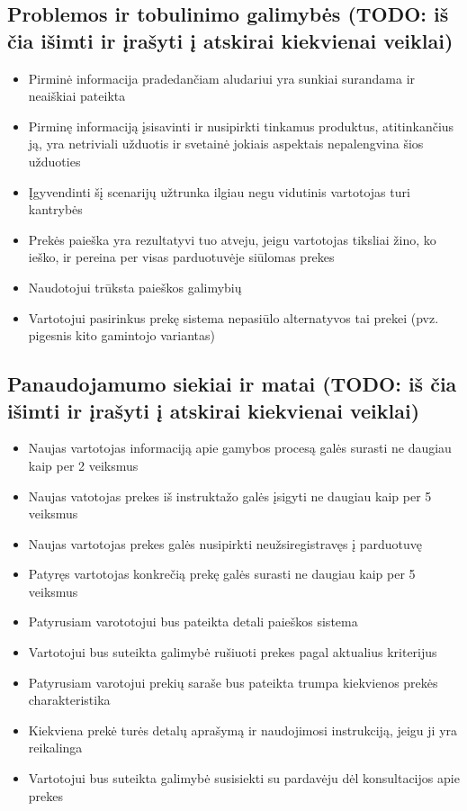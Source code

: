 \documentclass[oneside]{VUMIFPSkursinis}
\begin{document}
	\subsection{Problemos ir tobulinimo galimybės (TODO: iš čia išimti ir įrašyti į atskirai kiekvienai veiklai)}
		\begin{itemize}
			\item{Pirminė informacija pradedančiam aludariui yra sunkiai surandama ir neaiškiai pateikta}
			\item{Pirminę informaciją įsisavinti ir nusipirkti tinkamus produktus, atitinkančius ją, yra netriviali užduotis ir svetainė jokiais aspektais nepalengvina šios užduoties}
			\item{Įgyvendinti šį scenarijų užtrunka ilgiau negu vidutinis vartotojas turi kantrybės}
			\item{Prekės paieška yra rezultatyvi tuo atveju, jeigu vartotojas tiksliai žino, ko ieško, ir pereina per visas parduotuvėje siūlomas prekes}
			\item{Naudotojui trūksta paieškos galimybių}
			\item{Vartotojui pasirinkus prekę sistema nepasiūlo alternatyvos tai prekei (pvz. pigesnis kito gamintojo variantas)}
		\end{itemize}
	\subsection{Panaudojamumo siekiai ir matai (TODO: iš čia išimti ir įrašyti į atskirai kiekvienai veiklai)}
		\begin{itemize}
			\item{Naujas vartotojas informaciją apie gamybos procesą galės surasti ne daugiau kaip per 2 veiksmus}
			\item{Naujas vatotojas prekes iš instruktažo galės įsigyti ne daugiau kaip per 5 veiksmus}
			\item{Naujas vartotojas prekes galės nusipirkti neužsiregistravęs į parduotuvę}
			\item{Patyręs vartotojas konkrečią prekę galės surasti ne daugiau kaip per 5 veiksmus}
			\item{Patyrusiam varototojui bus pateikta detali paieškos sistema}
			\item{Vartotojui bus suteikta galimybė rušiuoti prekes pagal aktualius kriterijus}
			\item{Patyrusiam varotojui prekių saraše bus pateikta trumpa kiekvienos prekės charakteristika}
			\item{Kiekviena prekė turės detalų aprašymą ir naudojimosi instrukciją, jeigu ji yra reikalinga}
			\item{Vartotojui bus suteikta galimybė susisiekti su pardavėju dėl konsultacijos apie prekes}
		\end{itemize}
\end{document}

